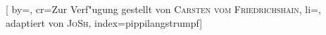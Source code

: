
[%
    by={},
    cr={Zur Verf"{u}gung gestellt von \textsc{Carsten vom Friedrichshain}},
    li={, adaptiert von \textsc{JoSh}},
    index={pippilangstrumpf}]


    \label{pippilangstrumpf}


    \begin{center}
    \end{center}

